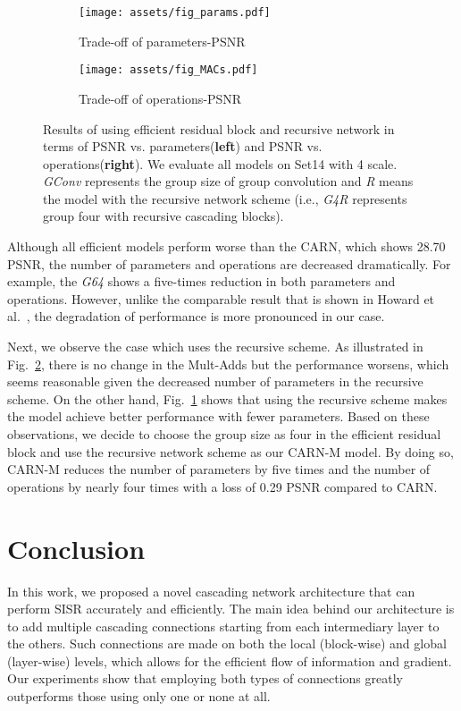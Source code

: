 \documentclass[runningheads]{llncs}
\begin{document}
\begin{figure}[tbp]
	\centering
	\begin{subfigure}[b]{0.48\textwidth}
		\texttt{[image: assets/fig\_params.pdf]}
		\caption{Trade-off of parameters-PSNR}
		\label{fig:params}
	\end{subfigure}
	\begin{subfigure}[b]{0.48\textwidth}
		\texttt{[image: assets/fig\_MACs.pdf]}
		\caption{Trade-off of operations-PSNR}
		\label{fig:macs}
	\end{subfigure}
	\caption{Results of using efficient residual block and recursive network in terms of PSNR vs. parameters(\textbf{left}) and PSNR vs. operations(\textbf{right}). We evaluate all models on Set14 with 4 scale. \textit{GConv} represents the group size of group convolution and \textit{R} means the model with the recursive network scheme (i.e., \textit{G4R} represents group four with recursive cascading blocks).}
	\label{fig:efficient}
\end{figure}

Although all efficient models perform worse than the CARN, which shows 28.70 PSNR, the number of parameters and operations are decreased dramatically. For example, the \textit{G64} shows a five-times reduction in both parameters and operations. However, unlike the comparable result that is shown in Howard et al.~\cite{mobilenets}, the degradation of performance is more pronounced in our case.

Next, we observe the case which uses the recursive scheme. As illustrated in Fig.~\ref{fig:macs}, there is no change in the Mult-Adds but the performance worsens, which seems reasonable given the decreased number of parameters in the recursive scheme. On the other hand, Fig.~\ref{fig:params} shows that using the recursive scheme makes the model achieve better performance with fewer parameters. Based on these observations, we decide to choose the group size as four in the efficient residual block and use the recursive network scheme as our CARN-M model. By doing so, CARN-M reduces the number of parameters by five times and the number of operations by nearly four times with a loss of 0.29 PSNR compared to CARN.

\section{Conclusion}
\label{sec:conclusion}
In this work, we proposed a novel cascading network architecture that can perform SISR accurately and efficiently. The main idea behind our architecture is to add multiple cascading connections starting from each intermediary layer to the others. Such connections are made on both the local (block-wise) and global (layer-wise) levels, which allows for the efficient flow of information and gradient. Our experiments show that employing both types of connections greatly outperforms those using only one or none at all.
\end{document}
